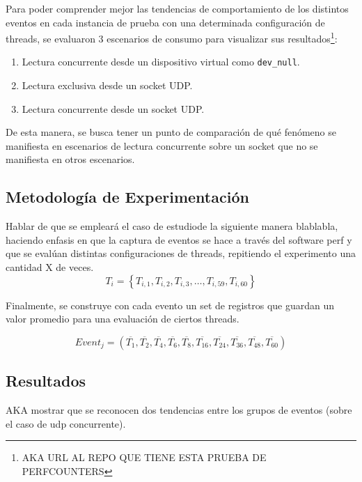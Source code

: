 Para poder comprender mejor las tendencias de comportamiento de los distintos eventos en cada instancia de prueba con una determinada configuración de threads, se evaluaron 3 escenarios de consumo para visualizar sus resultados\footnote{AKA URL AL REPO QUE TIENE ESTA PRUEBA DE PERFCOUNTERS}:
\begin{enumerate}
\item Lectura concurrente desde un dispositivo virtual como \verb=dev_null=.
\item Lectura exclusiva desde un socket UDP.
\item Lectura concurrente desde un socket UDP.
\end{enumerate}

De esta manera, se busca tener un punto de comparación de qué fenómeno se manifiesta en escenarios de lectura concurrente sobre un socket que no se manifiesta en otros escenarios.

\subsection{Metodología de Experimentación}
Hablar de que se empleará el caso de estudiode la siguiente manera blablabla, haciendo enfasis en que la captura de eventos se hace a través del software perf y que se evalúan distintas configuraciones de threads, repitiendo el experimento una cantidad X de veces.
\begin{equation}
T_i = \left\{ T_{i,1},T_{i,2},T_{i,3}, \dots ,T_{i,59}, T_{i,60}\right\} 
\end{equation}

Finalmente, se construye con cada evento un set de registros que guardan un valor promedio para una evaluación de ciertos threads.

\begin{equation}
Event_j = \left(\overline{T_{1}}, \overline{T_{2}}, \overline{T_{4}}, \overline{T_{6}}, \overline{T_{8}}, \overline{T_{16}}, \overline{T_{24}}, \overline{T_{36}}, \overline{T_{48}}, \overline{T_{60}}\right)
\end{equation}

\subsection{Resultados}
AKA mostrar que se reconocen dos tendencias entre los grupos de eventos (sobre el caso de udp concurrente).


